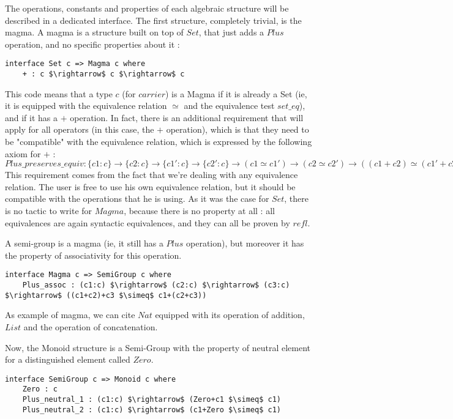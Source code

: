 The operations, constants and properties of each algebraic structure will be described in a dedicated interface. The first structure, completely trivial, is the magma. A magma is a structure built on top of $Set$, that just adds a $Plus$ operation, and no specific properties about it :

\begin{lstlisting}
interface Set c => Magma c where
    + : c $\rightarrow$ c $\rightarrow$ c
\end{lstlisting}

This code means that a type $c$ (for $carrier$) is a Magma if it is already a Set (ie, it is equipped with the equivalence relation $\simeq$ and the equivalence test $set\_eq$), and if it has a $+$ operation.
In fact, there is an additional requirement that will apply for all operators (in this case, the $+$ operation), which is that they need to be "compatible" with the equivalence relation, which is expressed by the following axiom for $+$ : \\ $Plus\_preserves\_equiv : \{c1:c\} \rightarrow \{c2:c\} \rightarrow \{c1':c\} \rightarrow \{c2':c\} \rightarrow (c1 \simeq c1') \rightarrow (c2 \simeq c2') \rightarrow ((c1+c2) \simeq (c1'+c2'))$ \\ 
This requirement comes from the fact that we're dealing with any equivalence relation. The user is free to use his own equivalence relation, but it should be compatible with the operations that he is using.
As it was the case for $Set$, there is no tactic to write for $Magma$, because there is no property at all : all equivalences are again syntactic equivalences, and they can all be proven by $refl$. 

A semi-group is a magma (ie, it still has a $Plus$ operation), but moreover it has the property of associativity for this operation. 

\begin{lstlisting}
interface Magma c => SemiGroup c where
    Plus_assoc : (c1:c) $\rightarrow$ (c2:c) $\rightarrow$ (c3:c) $\rightarrow$ ((c1+c2)+c3 $\simeq$ c1+(c2+c3))
\end{lstlisting}

As example of magma, we can cite $Nat$ equipped with its operation of addition, $List$ and the operation of concatenation.

Now, the Monoid structure is a Semi-Group with the property of neutral element for a distinguished element called $Zero$.

\begin{lstlisting}
interface SemiGroup c => Monoid c where
    Zero : c    
    Plus_neutral_1 : (c1:c) $\rightarrow$ (Zero+c1 $\simeq$ c1)    
    Plus_neutral_2 : (c1:c) $\rightarrow$ (c1+Zero $\simeq$ c1)
\end{lstlisting}

